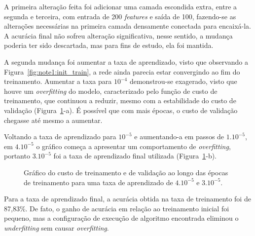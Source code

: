A primeira alteração feita foi adicionar uma camada escondida extra, entre a segunda e terceira, com entrada de 200 \textit{features} e saída de 100, fazendo-se as alterações necessárias na primeira camada densamente conectada para encaixá-la. A acurácia final não sofreu alteração significativa, nesse sentido, a mudança poderia ter sido descartada, mas para fins de estudo, ela foi mantida.

A segunda mudança foi aumentar a taxa de aprendizado, visto que observando a Figura~\ref{fig:note1:init_train}, a rede ainda parecia estar convergindo ao fim do treinamento. Aumentar a taxa para $10^{-4}$ demonstrou-se exagerado, visto que houve um \textit{overfitting} do modelo, caracterizado pelo função de custo de treinamento, que continuou a reduzir, mesmo com a estabilidade do custo de validação (Figura~\ref{fig:note1:train}-a). É possível que com mais épocas, o custo de validação chegasse até mesmo a aumentar.

Voltando a taxa de aprendizado para $10^{-5}$ e aumentando-a em passos de $1.10^{-5}$, em $4.10^{-5}$ o gráfico começa a apresentar um comportamento de \textit{overfitting}, portanto $3.10^{-5}$ foi a taxa de aprendizado final utilizada (Figura~\ref{fig:note1:train}-b).

\begin{figure}[!htb]
	\centering
	\caption{Gráfico do custo de treinamento e de validação ao longo das épocas de treinamento para uma taxa de aprendizado de $4.10^{-5}$ e $3.10^{-5}$.}
	\label{fig:note1:train}
\end{figure}

Para a taxa de aprendizado final, a acurácia obtida na taxa de treinamento foi de 87,83\%. De fato, o ganho de acurácia em relação ao treinamento inicial foi pequeno, mas a configuração de execução de algoritmo encontrada eliminou o \textit{underfitting} sem causar \textit{overfitting}.